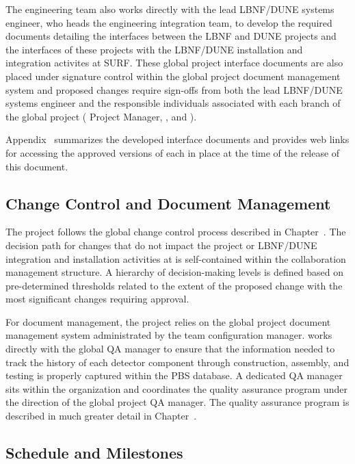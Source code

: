 The  engineering team also works directly with the lead
LBNF/DUNE systems engineer, who heads the  engineering
integration team, to develop the required documents detailing the
interfaces between the LBNF and DUNE projects and the interfaces
of these projects with the LBNF/DUNE installation and integration
activites at SURF.  These global project interface documents are
also placed under signature control within the global project
document management system and proposed changes require sign-offs
from both the lead LBNF/DUNE systems engineer and the responsible
individuals associated with each branch of the global project
( Project Manager,  , and
).

Appendix~\label{appC} summarizes the developed interface documents
and provides web links for accessing the approved versions of each
in place at the time of the release of this document.

 
\subsection{Change Control and Document Management}

The  project follows the global change control process
described in Chapter~\label{vl:tc-xxx}.  The decision path for
changes that do not impact the  project or LBNF/DUNE
integration and installation activities at  is
self-contained within the  collaboration management
structure.  A hierarchy of decision-making levels is defined based
on pre-determined thresholds related to the extent of the proposed
change with the most significant changes requiring 
 approval.

For document management, the  project relies on the global
project document management system administrated by the 
team configuration manager.   works directly with the global
QA manager to ensure that the information needed to track the history
of each detector component through construction, assembly, and testing
is properly captured within the PBS database.  A dedicated 
QA manager sits within the  organization and coordinates the
 quality assurance program under the direction of the
global project QA manager.  The  quality assurance program
is described in much greater detail in Chapter~\label{vl:tc-zzz}.

 
\subsection{Schedule and Milestones}

